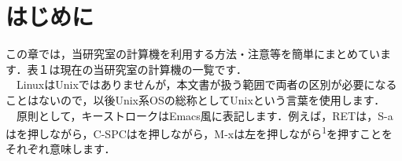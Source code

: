 \documentclass[main]{subfiles}
\begin{document}
\chapter{はじめに}
\fontsize{10.2}{10} \selectfont
この章では，当研究室の計算機を利用する方法・注意等を簡単にまとめています．表１は現在の当研究室の計算機の一覧です．\\
　LinuxはUnixではありませんが，本文書が扱う範囲で両者の区別が必要になることはないので，以後Unix系OSの総称としてUnixという言葉を使用します．\\
　原則として，キーストロークはEmacs風に表記します．例えば，RETは，S-aはを押しながら，C-SPCはを押しながら，M-xは左を押しながら\textsuperscript{1}を押すことをそれぞれ意味します．\\
\end{document}
